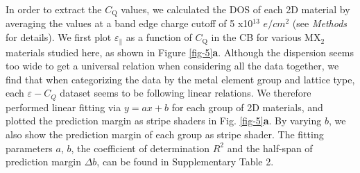 \documentclass[journal=ancac3,manuscript=article,email=true,hyperref=true,keywords=true]{achemso}
\begin{document}
In order to extract the \(C_{\mathrm{Q}}\) values, we calculated the DOS of each 2D
material by averaging the values at a band edge charge cutoff of 5 x10$^{13}$ $e/cm^2$ (see {\it Methods} for details). 
We first plot \(\varepsilon_{\parallel}\) as a function of \(C_{\mathrm{Q}}\) in the CB for 
various MX$_2$ materials studied here, as shown in Figure \ref{fig-5}{\bf a}.  Although the   %
dispersion seems too wide to get a universal relation when considering
all the data together, we find that when categorizing the data by the
metal element group and lattice type, each $\varepsilon - C_Q$ dataset seems to be following linear
relations. We therefore performed linear fitting via $y=ax+b$
for each group of 2D
materials, and plotted the prediction margin as stripe shaders in
Fig. \ref{fig-5}{\bf a}. By varying $b$, we also show the 
prediction margin of each group as stripe shader. 
The fitting parameters $a$, $b$, the coefficient of determination $R^2$ 
and the half-span of prediction margin $\Delta b$, can be found in Supplementary Table 2. 
   
\end{document}
